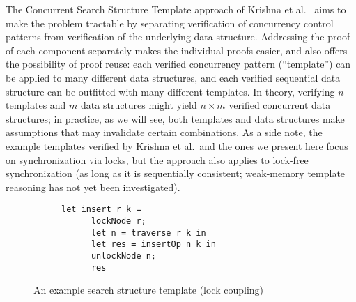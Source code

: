 \documentclass[a4paper,UKenglish,cleveref, autoref, thm-restate]{lipics-v2021}
\begin{document}
The Concurrent Search Structure Template approach of Krishna et al.~\cite{templates} aims to make the problem tractable by separating verification of concurrency control patterns from verification of the underlying data structure. Addressing the proof of each component separately makes the individual proofs easier, and also offers the possibility of proof reuse: each verified concurrency pattern (``template'') can be applied to many different data structures, and each verified sequential data structure can be outfitted with many different templates. In theory, verifying $n$ templates and $m$ data structures might yield $n \times m$ verified concurrent data structures; in practice, as we will see, both templates and data structures make assumptions that may invalidate certain combinations. %
As a side note, the example templates verified by Krishna et al.~and the ones we present here focus on synchronization via locks, but the approach also applies to lock-free synchronization (as long as it is sequentially consistent; weak-memory template reasoning has not yet been investigated).

\begin{figure}[h]
	\begin{subfigure}[t]{0.45\textwidth}
		 
	\end{subfigure}\qquad
	\begin{subfigure}[t]{0.48\textwidth}
	\begin{lstlisting}[language=caml, style=myStyle]
	let insert r k =
	  lockNode r;
	  let n = traverse r k in
	  let res = insertOp n k in
	  unlockNode n; 
	  res\end{lstlisting}
	\end{subfigure}
	\caption{An example search structure template (lock coupling)}
	\label{template-ex}
\end{figure}
\end{document}
